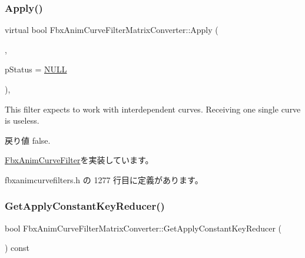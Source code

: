 \subsubsection{\texorpdfstring{Apply()}{Apply()}\hspace{0.1cm}{\footnotesize\ttfamily [7/7]}}
{\footnotesize\ttfamily virtual bool Fbx\+Anim\+Curve\+Filter\+Matrix\+Converter\+::\+Apply (\begin{DoxyParamCaption}\item[{\hyperlink{class_fbx_anim_curve}{Fbx\+Anim\+Curve} \&}]{,  }\item[{\hyperlink{class_fbx_status}{Fbx\+Status} $\ast$}]{p\+Status = {\ttfamily \hyperlink{fbxarch_8h_a070d2ce7b6bb7e5c05602aa8c308d0c4}{N\+U\+LL}} }\end{DoxyParamCaption})\hspace{0.3cm}{\ttfamily [inline]}, {\ttfamily [virtual]}}

This filter expects to work with interdependent curves. Receiving one single curve is useless. \begin{DoxyReturn}{戻り値}
{\ttfamily false}. 
\end{DoxyReturn}


\hyperlink{class_fbx_anim_curve_filter_a6a69996c47c0e6f63a0f8b0d5fa806a0}{Fbx\+Anim\+Curve\+Filter}を実装しています。



 fbxanimcurvefilters.\+h の 1277 行目に定義があります。

\mbox{\label{class_fbx_anim_curve_filter_matrix_converter_a01b2d31ebe1cc32373d01c7b3f3e7797}} 
\subsubsection{\texorpdfstring{Get\+Apply\+Constant\+Key\+Reducer()}{GetApplyConstantKeyReducer()}}
{\footnotesize\ttfamily bool Fbx\+Anim\+Curve\+Filter\+Matrix\+Converter\+::\+Get\+Apply\+Constant\+Key\+Reducer (\begin{DoxyParamCaption}{ }\end{DoxyParamCaption}) const}


